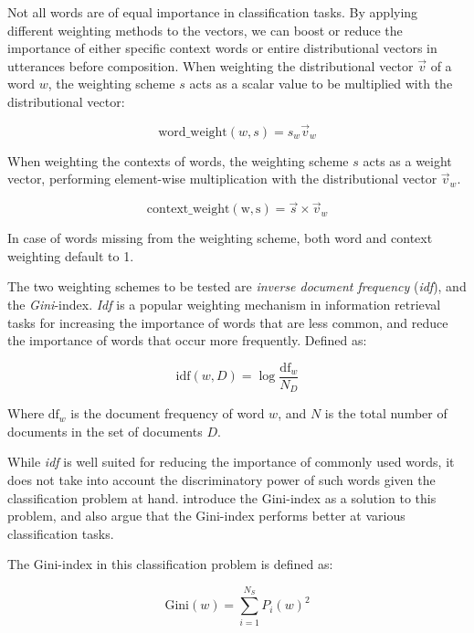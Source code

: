 Not all words are of equal importance in classification tasks. By applying different weighting methods to the vectors, we can boost or reduce the importance of either specific context words or entire distributional vectors in utterances before composition. When weighting the distributional vector $\vec{v}$ of a word $w$, the weighting scheme $s$ acts as a scalar value to be multiplied with the distributional vector:

\begin{equation}
\mathrm{word\_weight}(w, s) = s_w \vec{v}_w
\end{equation}

When weighting the contexts of words, the weighting scheme $s$ acts as a weight vector, performing element-wise multiplication with the distributional vector $\vec{v}_w$.

\begin{equation}
\mathrm{context\_weight(w, s)} = \vec{s} \times \vec{v}_w
\end{equation}

In case of words missing from the weighting scheme, both word and context weighting default to 1.

The two weighting schemes to be tested are \emph{inverse document frequency} (\emph{idf}), and the \emph{Gini}-index. \emph{Idf} is a popular weighting mechanism in information retrieval tasks for increasing the importance of words that are less common, and reduce the importance of words that occur more frequently. Defined as:

\begin{equation}
\mathrm{idf}(w, D) =  \log \frac{\mathrm{df}_w}{N_D}
\end{equation}

Where $\mathrm{df}_w$ is the document frequency of word $w$, and $N$ is the total number of documents in the set of documents $D$.

While \emph{idf} is well suited for reducing the importance of commonly used words, it does not take into account the discriminatory power of such words given the classification problem at hand. \textcite{Zhu2013Using} introduce the Gini-index as a solution to this problem, and also argue that the Gini-index performs better at various classification tasks.

The Gini-index in this classification problem is defined as:

\begin{equation}
\mathrm{Gini}(w) = \sum\limits_{i=1}^{N_S} P_i(w)^2
\end{equation}

